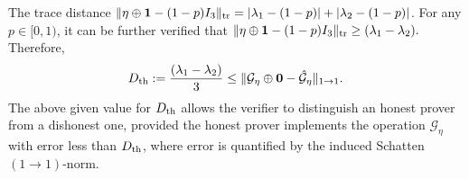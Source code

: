 \documentclass[amsmath,amssymb,aps,pra,superscriptaddress,twocolumn]{revtex4-2}
\begin{document}
\begin{appendix}
 The trace distance $\|\eta\oplus\bm{1}-(1-p)I_3\|_{\rm tr} = \vert \lambda_1-(1-p)\vert + \vert\lambda_2-(1-p)\vert$.
 For any $p\in[0,1)$, it can be further verified that $\|\eta\oplus\bm{1}-(1-p)I_3\|_{\rm tr}\geq {(\lambda_1-\lambda_2)}.$
 Therefore, 
 \begin{equation}
     D_{\rm th} :=  \frac{(\lambda_1-\lambda_2)}{3} \leq \|\mathcal{G}_\eta\oplus\bm{0}-\hat{\mathcal{G}}_\eta\|_{1\to 1}.
 \end{equation}
  The above given value for $D_{\rm th}$ allows the verifier to distinguish an honest prover from a dishonest one, provided the honest prover 
  implements the operation $\mathcal{G}_{\eta}$ with error less than $D_{\rm th}$, where error is quantified by the induced Schatten $(1\to 1)$-norm.

\end{appendix}

\end{document}

